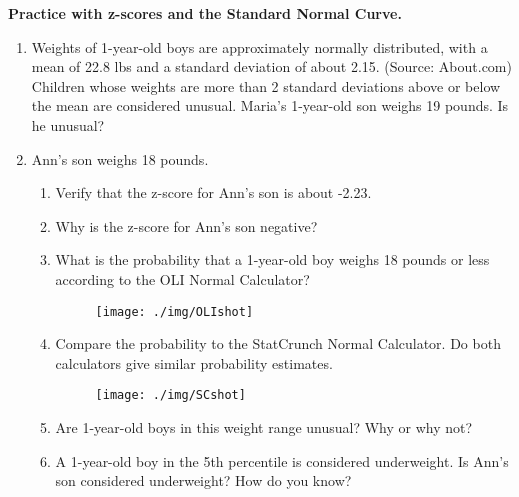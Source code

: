 \textbf{Practice with z-scores and the Standard Normal Curve.}
\begin{enumerate}
\item Weights of 1-year-old boys are approximately normally distributed, with a mean of 22.8 lbs and a standard deviation of about 2.15. (Source: About.com) Children whose weights are more than 2 standard deviations above or below the mean are considered unusual. Maria's 1-year-old son weighs 19 pounds. Is he unusual? \\[1in]
\item Ann's son weighs 18 pounds. 
\begin{enumerate}
\item Verify that the z-score for Ann's son is about -2.23.\\[.5cm]
\item Why is the z-score for Ann's son negative? \\[.5cm]
\item What is the probability that a 1-year-old boy weighs 18 pounds or less according to the OLI Normal Calculator?  
\begin{figure}[h]
\centering{}\texttt{[image: ./img/OLIshot]} 
\end{figure}
\vspace{.5in}

\item Compare the probability to the StatCrunch Normal Calculator. Do both calculators give similar probability estimates.
\begin{figure}[h]
\centering{}\texttt{[image: ./img/SCshot]} 
\end{figure}
\vspace{.5in}
\item Are 1-year-old boys in this weight range unusual? Why or why not? \\[.5cm]
\item A 1-year-old boy in the 5th percentile is considered underweight. Is Ann's son considered underweight? How do you know? 
\end{enumerate}

\end{enumerate}


